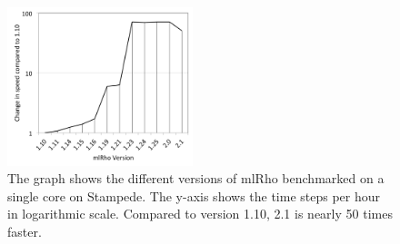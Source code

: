 \documentclass{sig-alternate}
\newcommand{\abhi}[1]{ {\textcolor{red} { ***Abhinav: #1 }}}
\newcommand{\abhi}[1]{ {}}
\newcommand{\ty}{\texttt}
\begin{document}
\begin{figure} %
\centering
\includegraphics[width=0.48\textwidth]{figures/mlrho-benchmarks.png}
\caption{The graph shows the different versions of mlRho benchmarked on a single core on Stampede. The y-axis shows the time steps per hour in logarithmic scale. Compared to version 1.10,  2.1 is nearly 50 times faster. }
\label{fig:stampede-bench}
\end{figure}

%

\end{document}
